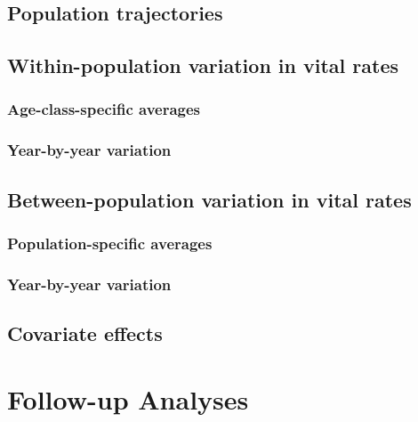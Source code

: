 \documentclass[
]{book}
\begin{document}
\hypertarget{population-trajectories}{%
\section{Population trajectories}\label{population-trajectories}}

\hypertarget{within-population-variation-in-vital-rates}{%
\section{Within-population variation in vital rates}\label{within-population-variation-in-vital-rates}}

\hypertarget{age-class-specific-averages}{%
\subsection{Age-class-specific averages}\label{age-class-specific-averages}}

\hypertarget{year-by-year-variation}{%
\subsection{Year-by-year variation}\label{year-by-year-variation}}

\hypertarget{between-population-variation-in-vital-rates}{%
\section{Between-population variation in vital rates}\label{between-population-variation-in-vital-rates}}

\hypertarget{population-specific-averages}{%
\subsection{Population-specific averages}\label{population-specific-averages}}

\hypertarget{year-by-year-variation-1}{%
\subsection{Year-by-year variation}\label{year-by-year-variation-1}}

\hypertarget{covariate-effects}{%
\section{Covariate effects}\label{covariate-effects}}

\hypertarget{AddAnalyses}{%
\chapter{Follow-up Analyses}\label{AddAnalyses}}
\end{document}
